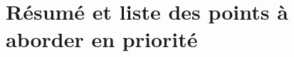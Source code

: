 \documentclass[11pt,a4paper]{article}
\begin{document}
%
%
% 
%
%
%
%






\clearpage



\clearpage
\section{Résumé et liste des points à aborder en priorité}
\end{document}
